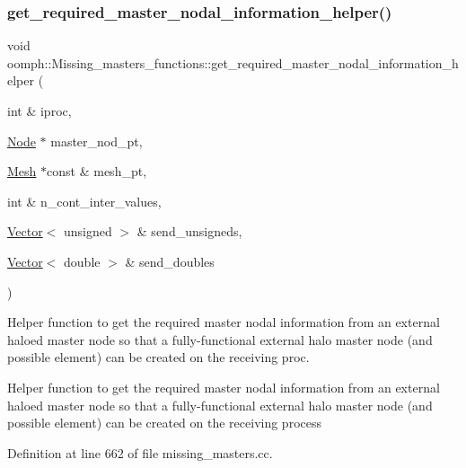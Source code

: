 \subsubsection{\texorpdfstring{get\+\_\+required\+\_\+master\+\_\+nodal\+\_\+information\+\_\+helper()}{get\_required\_master\_nodal\_information\_helper()}}
{\footnotesize\ttfamily void oomph\+::\+Missing\+\_\+masters\+\_\+functions\+::get\+\_\+required\+\_\+master\+\_\+nodal\+\_\+information\+\_\+helper (\begin{DoxyParamCaption}\item[{int \&}]{iproc,  }\item[{\hyperlink{classoomph_1_1Node}{Node} $\ast$}]{master\+\_\+nod\+\_\+pt,  }\item[{\hyperlink{classoomph_1_1Mesh}{Mesh} $\ast$const \&}]{mesh\+\_\+pt,  }\item[{int \&}]{n\+\_\+cont\+\_\+inter\+\_\+values,  }\item[{\hyperlink{classoomph_1_1Vector}{Vector}$<$ unsigned $>$ \&}]{send\+\_\+unsigneds,  }\item[{\hyperlink{classoomph_1_1Vector}{Vector}$<$ double $>$ \&}]{send\+\_\+doubles }\end{DoxyParamCaption})}



Helper function to get the required master nodal information from an external haloed master node so that a fully-\/functional external halo master node (and possible element) can be created on the receiving proc. 

Helper function to get the required master nodal information from an external haloed master node so that a fully-\/functional external halo master node (and possible element) can be created on the receiving process 

Definition at line 662 of file missing\+\_\+masters.\+cc.



